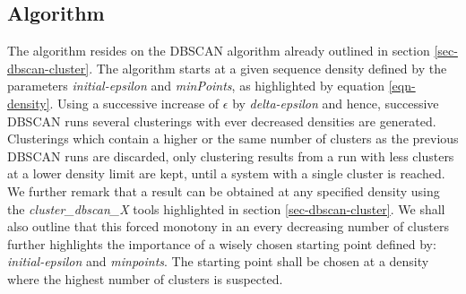 \subsection{Algorithm}

The algorithm resides on the DBSCAN algorithm already outlined in
section \ref{sec-dbscan-cluster}. The algorithm starts at a given
sequence density defined by the parameters \emph{initial-epsilon} and
\emph{minPoints}, as highlighted by equation \ref{eqn-density}. Using
a successive increase of $\epsilon$ by \emph{delta-epsilon} and hence,
successive DBSCAN runs several clusterings with ever decreased
densities are generated. Clusterings which contain a higher or the same
number of clusters as the previous DBSCAN runs are discarded, only
clustering results from a run with less clusters at a lower density
limit are kept,
until a system with a single cluster is reached. We further remark
that a result can be obtained at any specified density using the
\emph{cluster\_dbscan\_X} 
tools highlighted in section \ref{sec-dbscan-cluster}. We shall also
outline that this forced monotony in an every decreasing number of
clusters further highlights the importance of a wisely chosen starting
point defined by:
\emph{initial-epsilon} and \emph{minpoints}. The starting
point shall be chosen at a density where the highest number of
clusters is suspected.


